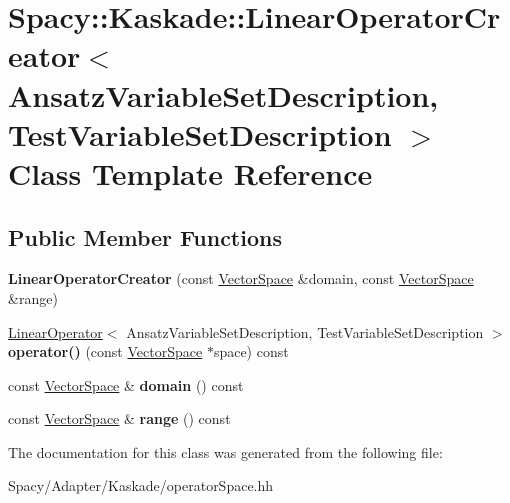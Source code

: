\hypertarget{classSpacy_1_1Kaskade_1_1LinearOperatorCreator}{}\section{Spacy\+:\+:Kaskade\+:\+:Linear\+Operator\+Creator$<$ Ansatz\+Variable\+Set\+Description, Test\+Variable\+Set\+Description $>$ Class Template Reference}
\label{classSpacy_1_1Kaskade_1_1LinearOperatorCreator}
\subsection*{Public Member Functions}
\begin{DoxyCompactItemize}
\item 
\hypertarget{classSpacy_1_1Kaskade_1_1LinearOperatorCreator_a3cc4089037dcdf7e896b95d19063f56a}{}{\bfseries Linear\+Operator\+Creator} (const \hyperlink{classSpacy_1_1VectorSpace}{Vector\+Space} \&domain, const \hyperlink{classSpacy_1_1VectorSpace}{Vector\+Space} \&range)\label{classSpacy_1_1Kaskade_1_1LinearOperatorCreator_a3cc4089037dcdf7e896b95d19063f56a}

\item 
\hypertarget{classSpacy_1_1Kaskade_1_1LinearOperatorCreator_a7897a3843021097021854f7e1fcd938f}{}\hyperlink{classSpacy_1_1Kaskade_1_1LinearOperator}{Linear\+Operator}$<$ Ansatz\+Variable\+Set\+Description, Test\+Variable\+Set\+Description $>$ {\bfseries operator()} (const \hyperlink{classSpacy_1_1VectorSpace}{Vector\+Space} $\ast$space) const \label{classSpacy_1_1Kaskade_1_1LinearOperatorCreator_a7897a3843021097021854f7e1fcd938f}

\item 
\hypertarget{classSpacy_1_1Kaskade_1_1LinearOperatorCreator_ae5a94e31d885dcf4526737e5ab60e91a}{}const \hyperlink{classSpacy_1_1VectorSpace}{Vector\+Space} \& {\bfseries domain} () const \label{classSpacy_1_1Kaskade_1_1LinearOperatorCreator_ae5a94e31d885dcf4526737e5ab60e91a}

\item 
\hypertarget{classSpacy_1_1Kaskade_1_1LinearOperatorCreator_ae36b9e5b49159981d712a1d7193f52f8}{}const \hyperlink{classSpacy_1_1VectorSpace}{Vector\+Space} \& {\bfseries range} () const \label{classSpacy_1_1Kaskade_1_1LinearOperatorCreator_ae36b9e5b49159981d712a1d7193f52f8}

\end{DoxyCompactItemize}


The documentation for this class was generated from the following file\+:\begin{DoxyCompactItemize}
\item 
Spacy/\+Adapter/\+Kaskade/operator\+Space.\+hh\end{DoxyCompactItemize}
